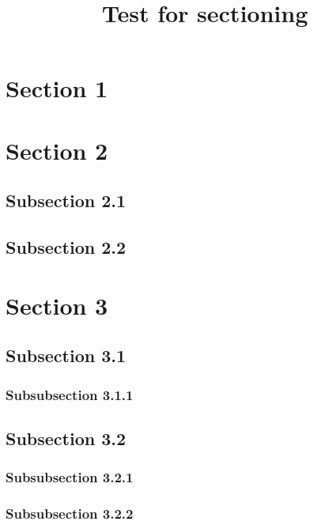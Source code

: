 \usepackage{lipsum}

\title{Test for sectioning}
\author{}
\date{}

\usepackage{calc}
\usepackage{longtable}
\usepackage{tabu}
\usepackage{breqn}
\setlength{\arraycolsep}{0.800000em}
\renewcommand{\arraystretch}{1.400000}

\renewcommand{\baselinestretch}{1.250000}
\selectfont
\setlength{\parskip}{1.0\baselineskip}

\maketitle
\tableofcontents



\lipsum[1-1]

\section{Section 1}

\lipsum[2-3]

\section{Section 2}

\subsection{Subsection 2.1}

\lipsum[4-6]

\subsection{Subsection 2.2}

\lipsum[7-9]

\section{Section 3}

\lipsum[10-12]

\subsection{Subsection 3.1}

\subsubsection{Subsubsection 3.1.1}

\lipsum[13-15]

\subsection{Subsection 3.2}

\lipsum[16-18]

\subsubsection{Subsubsection 3.2.1}

\lipsum[19-21]

\subsubsection{Subsubsection 3.2.2}

\lipsum[22-23]


